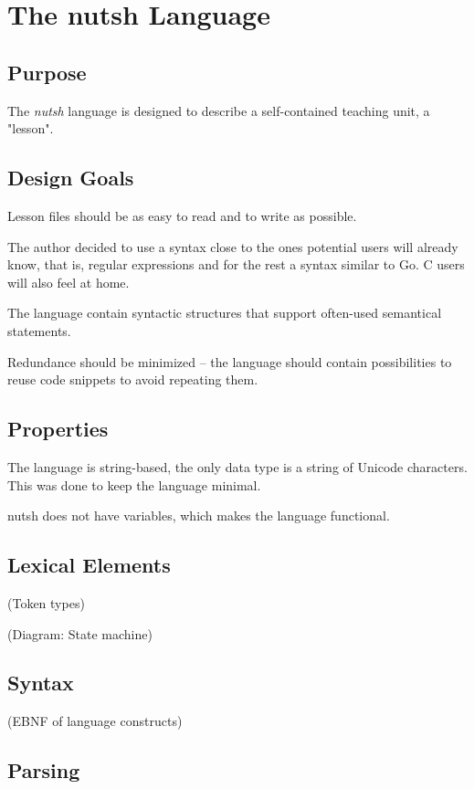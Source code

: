 \documentclass[twoside]{scrreprt}
\begin{document}
\chapter{The nutsh Language}

\section{Purpose}

The \emph{nutsh} language is designed to describe a self-contained teaching unit, a "lesson".

\section{Design Goals}

Lesson files should be as easy to read and to write as possible.

The author decided to use a syntax close to the ones potential users will already know, that is, regular expressions and for the rest a syntax similar to Go. C users will also feel at home.

The language contain syntactic structures that support often-used semantical statements.

Redundance should be minimized -- the language should contain possibilities to reuse code snippets to avoid repeating them.

\section{Properties}

The language is string-based, the only data type is a string of Unicode characters. This was done to keep the language minimal.

nutsh does not have variables, which makes the language functional.

\section{Lexical Elements}

(Token types)

(Diagram: State machine)

\section{Syntax}

(EBNF of language constructs)

\section{Parsing}
\end{document}
